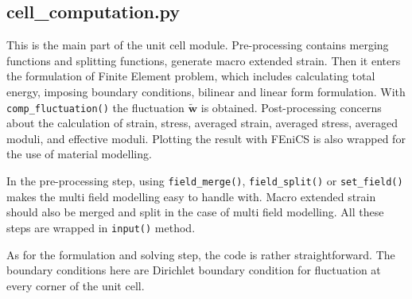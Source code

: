 \subsection{cell\_computation.py}
This is the main part of the unit cell module. Pre-processing contains merging functions and splitting functions, generate macro extended strain. Then it enters the formulation of Finite Element problem, which includes calculating total energy, imposing boundary conditions, bilinear and linear form formulation. With \texttt{comp\_fluctuation()} the fluctuation $\widetilde{\mathbf{w}}$ is obtained. Post-processing concerns about the calculation of strain, stress, averaged strain, averaged stress, averaged moduli, and effective moduli. Plotting the result with FEniCS is also wrapped for the use of material modelling.

In the pre-processing step, using \texttt{field\_merge()}, \texttt{field\_split()} or \texttt{set\_field()} makes the multi field modelling easy to handle with. Macro extended strain should also be merged and split in the case of multi field modelling. All these steps are wrapped in \texttt{input()} method.

As for the formulation and solving step, the code is rather straightforward. The boundary conditions here are Dirichlet boundary condition for fluctuation at every corner of the unit cell.


